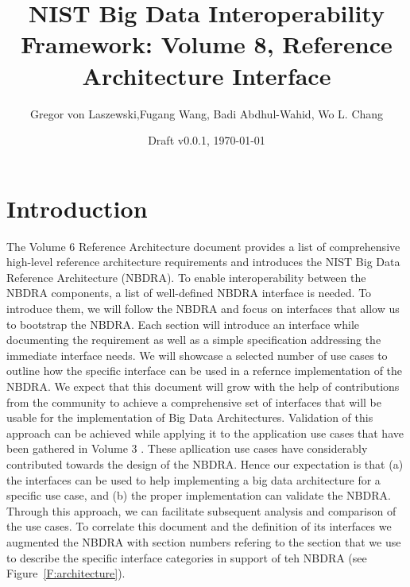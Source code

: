 \documentclass[10pt]{article}
\title{NIST Big Data Interoperability Framework: Volume 8, Reference
       Architecture Interface}
\author{Gregor von Laszewski,Fugang Wang, Badi Abdhul-Wahid, 
        Wo L. Chang}
\date{Draft v0.0.1, \today}
\begin{document}



\flushbottom %




%


\newpage

\linenumbers
\section{Introduction}

The Volume 6 Reference Architecture document provides a list of
comprehensive high-level reference architecture requirements and
introduces the NIST Big Data Reference Architecture (NBDRA). To enable
interoperability between the NBDRA components, a list of well-defined
NBDRA interface is needed. To introduce them, we will follow the NBDRA
and focus on interfaces that allow us to bootstrap the NBDRA. Each
section will introduce an interface while documenting the requirement
as well as a simple specification addressing the immediate interface
needs. We will showcase a selected number of use cases to outline how
the specific interface can be used in a refernce implementation of the
NBDRA. We expect that this document will grow with the help of
contributions from the community to achieve a comprehensive set of
interfaces that will be usable for the implementation of Big Data
Architectures. Validation of this approach can be achieved while
applying it to the application use cases that have been gathered in
Volume 3 \cite{}. These apllication use cases have considerably
contributed towards the design of the NBDRA. Hence our expectation is
that (a) the interfaces can be used to help implementing a big data
architecture for a specific use case, and (b) the proper
implementation can validate the NBDRA. Through this approach, we can
facilitate subsequent analysis and comparison of the use cases. To
correlate this document and the definition of its interfaces we
augmented the NBDRA with section numbers refering to the section that
we use to describe the specific interface categories in support of teh
NBDRA (see Figure~\ref{F:architecture}).
\end{document}

